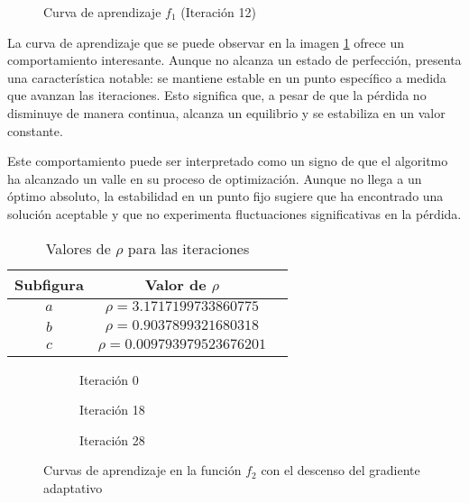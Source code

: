 \begin{figure}[h]
  \centering
    
  \caption{Curva de aprendizaje $f_1$ (Iteración 12)}
  \captionsetup{justification=centering}
  \label{fig:learning-adagrad-f1-12}
\end{figure}

La curva de aprendizaje que se puede observar en la imagen \ref{fig:learning-adagrad-f1-12} ofrece un comportamiento interesante. Aunque no alcanza un estado de perfección, presenta una característica notable: se mantiene estable en un punto específico a medida que avanzan las iteraciones. Esto significa que, a pesar de que la pérdida no disminuye de manera continua, alcanza un equilibrio y se estabiliza en un valor constante.

Este comportamiento puede ser interpretado como un signo de que el algoritmo ha alcanzado un valle en su proceso de optimización. Aunque no llega a un óptimo absoluto, la estabilidad en un punto fijo sugiere que ha encontrado una solución aceptable y que no experimenta fluctuaciones significativas en la pérdida.


\begin{table}[H]
    \centering
    \caption{Valores de $\rho$ para las iteraciones}
    \begin{tabular}{|c|c|c|}
    \hline
    \textbf{Subfigura} & \textbf{Valor de $\rho$} \\
    \hline
    $a$ & $\rho = 3.1717199733860775 $ \\
    \hline 
    $b$ & $\rho = 0.9037899321680318 $ \\
    \hline
    $c$ & $\rho =  0.009793979523676201 $ \\
    \hline
    \end{tabular}
    \label{tab:valores-rho-adaptativo-f2}
\end{table}

\begin{figure}[h!]
     \centering
     \begin{subfigure}[b]{0.45\textwidth}
         \centering
         
         \caption{Iteración 0}
         \label{fig:learning-adagrad-f2-0}
     \end{subfigure}
     \hfill
     \begin{subfigure}[b]{0.45\textwidth}
         \centering
         
         \caption{Iteración 18}
         \label{fig:learning-adagrad-f2-18}
     \end{subfigure}
     \hfill
     \begin{subfigure}[b]{0.45\textwidth}
         \centering
         
         \caption{Iteración 28}
         \label{fig:learning-adagrad-f2-28}
     \end{subfigure}
        \caption{Curvas de aprendizaje en la función $f_2$ con el descenso del gradiente adaptativo}
        \label{fig:learning-curves-adagrad-f2}
\end{figure}

